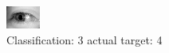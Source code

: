 \begin{figure}[h!]
\begin{center}
\includegraphics[width=0.60\columnwidth]{figures/ID3200_class_3_target_4.png}
\end{center}
\caption{ Classification: 3 actual target: 4}
\label{fig:ID3200_class_3_target_4}
\end{figure}
